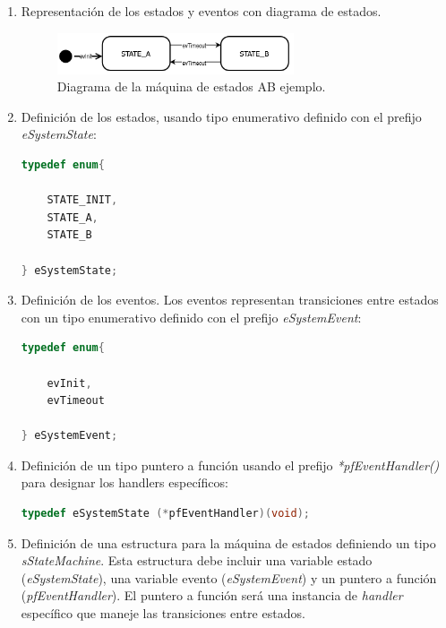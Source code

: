 \begin{enumerate}
\item Representación de los estados y eventos con diagrama de estados.
\begin{figure}[ht]
	\centering
	\includegraphics[width=0.66\textwidth]{./Figures/statemachineAB.png}
	\caption{Diagrama de la máquina de estados AB ejemplo.}
	\label{fig:fsmAB}
\end{figure}

\item Definición de los estados, usando tipo enumerativo definido con el prefijo \textit{eSystemState}:

\begin{lstlisting}[caption=Definición de estados.,
	language=C, 
	backgroundcolor=\color{mygray},
	]
typedef enum{
    
    STATE_INIT,
	STATE_A,
	STATE_B

} eSystemState;
\end{lstlisting}

\item Definición de los eventos. Los eventos representan transiciones entre estados con un tipo enumerativo definido con el prefijo \textit{eSystemEvent}:

\begin{lstlisting}[caption=Definición de eventos.,
	language=C, 
	backgroundcolor=\color{mygray},
	]
typedef enum{

	evInit,
	evTimeout

} eSystemEvent;
\end{lstlisting}

\item Definición de un tipo puntero a función usando el prefijo \textit{*pfEventHandler()} para designar los handlers específicos:

\begin{lstlisting}[caption=Definición de puntero a handlers.,
	language=C, 
	backgroundcolor=\color{mygray},
	]
typedef eSystemState (*pfEventHandler)(void);
\end{lstlisting}

\item Definición de una estructura para la máquina de estados definiendo un tipo \textit{sStateMachine}. Esta estructura debe incluir una variable estado (\textit{eSystemState}), una variable evento (\textit{eSystemEvent}) y un puntero a función (\textit{pfEventHandler}). El puntero a función será una instancia de \textit{handler} específico que maneje las transiciones entre estados. 


\end{enumerate}
